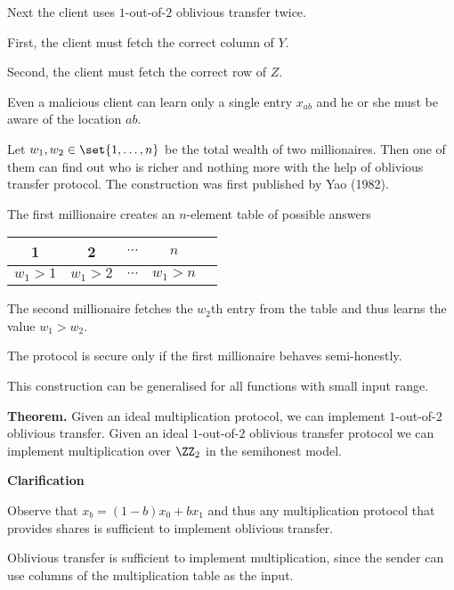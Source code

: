 \documentclass[landscape,dvips,footrule]{foils}
\begin{document}
Next the client uses $1$-out-of-$2$ oblivious transfer twice.
\begin{triangles}
  \item First, the client must fetch the correct column of $Y$.
  \item Second, the client must fetch the correct row of $Z$.
\end{triangles}
Even a malicious client can learn only a single entry $x_{ab}$ and he
or she must be aware of the location $ab$.



Let $w_1,w_2\in\set{1,\ldots,n}$ be the total wealth of two
millionaires. Then one of them can find out who is richer and nothing
more with the help of oblivious transfer protocol. The construction
was first published by Yao (1982).
\begin{triangles}
  \item The first millionaire creates an $n$-element table of possible answers\vspace*{2ex}
    \begin{center}
      \begin{tabular}{|c|c|c|c|c|}
        \hline
        1 & 2 & $\cdots$ & $n$\\
        \hline
       $w_1>1$ & $w_1>2$ & $\cdots$ & $w_1>n$\\
       \hline
      \end{tabular}\vspace*{3ex}
    \end{center}
  \item The second millionaire fetches the $w_2$th entry from the
    table and thus learns the value $w_1>w_2$.
  \item The protocol is secure only if the first millionaire behaves
    semi-honestly.
\end{triangles}\vspace*{1cm}

This construction can be generalised for all functions with small
input range.



\textbf{Theorem.}  Given an ideal multiplication protocol, we can
implement $1$-out-of-$2$ oblivious transfer. Given an ideal
$1$-out-of-$2$ oblivious transfer protocol we can implement
multiplication over $\ZZ_2$ in the semihonest model.

\textbf{Clarification}
\begin{triangles}
\item Observe that $x_b=(1-b)x_0+bx_1$ and thus any multiplication
  protocol that provides shares is sufficient to implement oblivious transfer.
\item Oblivious transfer is sufficient to implement multiplication,
  since the sender can use columns of the multiplication table as the
  input.
\end{triangles}\vspace*{3ex}
\end{document}
